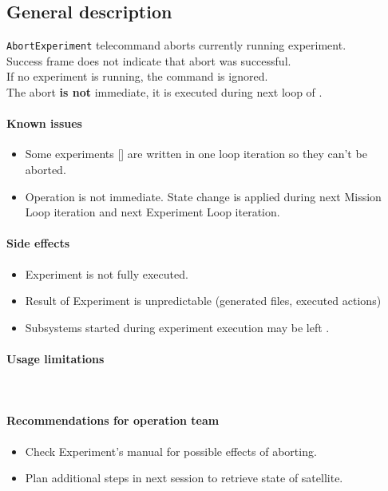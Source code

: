 

\subsection{General description}
\texttt{AbortExperiment} telecommand aborts currently running experiment.\\
Success frame does not indicate that abort was successful.\\
If no experiment is running, the command is ignored.\\
The abort \textbf{is not} immediate, it is executed during next loop of .

\paragraph{Known issues}
\begin{itemize}
	\item Some experiments [] are written in one loop iteration so they can't be aborted.
	\item Operation is not immediate. State change is applied during next Mission Loop iteration and next Experiment Loop iteration.
\end{itemize}

\paragraph{Side effects}
\begin{itemize}
	\item Experiment is not fully executed.
	\item Result of Experiment is unpredictable (generated files, executed actions)
	\item Subsystems started during experiment execution may be left .
\end{itemize}

\paragraph{Usage limitations}\mbox{}\\ 
\None

\paragraph{Recommendations for operation team}
\begin{itemize}
	\item Check Experiment's manual for possible effects of aborting.
	\item Plan additional steps in next session to retrieve state of satellite.
\end{itemize}

